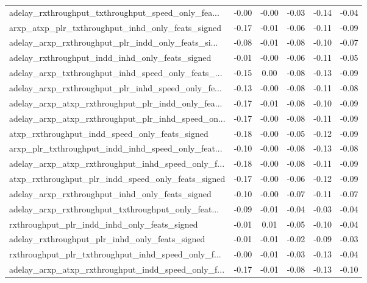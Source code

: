\begin{tabular}{|l|*{4}{c}|r|}
adelay\_rxthroughput\_txthroughput\_speed\_only\_fea... & -0.00 & -0.00 &   -0.03 &      -0.14 & -0.04 \\
arxp\_atxp\_plr\_txthroughput\_inhd\_only\_feats\_signed  & -0.17 & -0.01 &   -0.06 &      -0.11 & -0.09 \\
adelay\_arxp\_rxthroughput\_plr\_indd\_only\_feats\_si... & -0.08 & -0.01 &   -0.08 &      -0.10 & -0.07 \\
adelay\_rxthroughput\_indd\_inhd\_only\_feats\_signed    & -0.01 & -0.00 &   -0.06 &      -0.11 & -0.05 \\
adelay\_arxp\_txthroughput\_inhd\_speed\_only\_feats\_... & -0.15 &  0.00 &   -0.08 &      -0.13 & -0.09 \\
adelay\_arxp\_rxthroughput\_plr\_inhd\_speed\_only\_fe... & -0.13 & -0.00 &   -0.08 &      -0.11 & -0.08 \\
adelay\_arxp\_atxp\_rxthroughput\_plr\_indd\_only\_fea... & -0.17 & -0.01 &   -0.08 &      -0.10 & -0.09 \\
adelay\_arxp\_atxp\_rxthroughput\_plr\_inhd\_speed\_on... & -0.17 & -0.00 &   -0.08 &      -0.11 & -0.09 \\
atxp\_rxthroughput\_indd\_speed\_only\_feats\_signed     & -0.18 & -0.00 &   -0.05 &      -0.12 & -0.09 \\
arxp\_plr\_txthroughput\_indd\_inhd\_speed\_only\_feat... & -0.10 & -0.00 &   -0.08 &      -0.13 & -0.08 \\
adelay\_arxp\_atxp\_rxthroughput\_inhd\_speed\_only\_f... & -0.18 & -0.00 &   -0.08 &      -0.11 & -0.09 \\
atxp\_rxthroughput\_plr\_indd\_speed\_only\_feats\_signed & -0.17 & -0.00 &   -0.06 &      -0.12 & -0.09 \\
adelay\_arxp\_rxthroughput\_inhd\_only\_feats\_signed    & -0.10 & -0.00 &   -0.07 &      -0.11 & -0.07 \\
adelay\_arxp\_rxthroughput\_txthroughput\_only\_feat... & -0.09 & -0.01 &   -0.04 &      -0.03 & -0.04 \\
rxthroughput\_plr\_indd\_inhd\_only\_feats\_signed       & -0.01 &  0.01 &   -0.05 &      -0.10 & -0.04 \\
adelay\_rxthroughput\_plr\_inhd\_only\_feats\_signed     & -0.01 & -0.01 &   -0.02 &      -0.09 & -0.03 \\
rxthroughput\_plr\_txthroughput\_inhd\_speed\_only\_f... & -0.00 & -0.01 &   -0.03 &      -0.13 & -0.04 \\
adelay\_arxp\_atxp\_rxthroughput\_indd\_speed\_only\_f... & -0.17 & -0.01 &   -0.08 &      -0.13 & -0.10 \\

\end{tabular}
